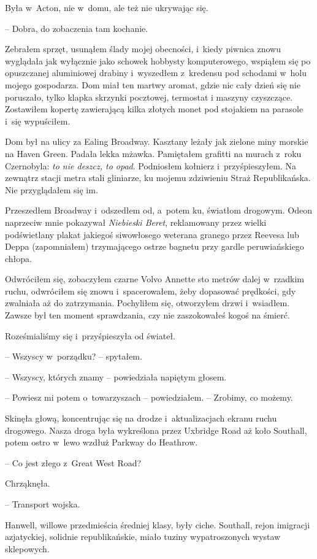 \documentclass[oneside,polish,11pt,sfheadings]{mwbk}
\begin{document}
Była w~Acton, nie w~domu, ale też nie ukrywając się.

-- Dobra, do zobaczenia tam kochanie.

Zebrałem sprzęt, usunąłem ślady mojej obecności, i~kiedy piwnica znowu
wyglądała jak wyłącznie jako schowek hobbysty komputerowego, wspiąłem
się po opuszczanej aluminiowej drabiny i~wyszedłem z~kredensu pod
schodami w~holu mojego gospodarza. Dom miał ten martwy aromat, gdzie nic
cały dzień się nie poruszało, tylko klapka skrzynki pocztowej, termostat
i maszyny czyszczące. Zostawiłem kopertę zawierającą kilka złotych monet
pod stojakiem na parasole i~się wypuściłem.

Dom był na ulicy za Ealing Broadway. Kasztany leżały jak zielone miny
morskie na Haven Green. Padała lekka mżawka. Pamiętałem grafitti na
murach z~roku Czernobyla: \emph{to nie deszcz, to opad}. Podniosłem
kołnierz i~przyśpieszyłem. Na zewnątrz stacji metra stali gliniarze, ku
mojemu zdziwieniu Straż Republikańska. Nie przyglądałem się im.

Przeszedłem Broadway i~odszedłem od, a~potem ku, światłom drogowym.
Odeon naprzeciw mnie pokazywał \emph{Niebieski Beret}, reklamowany przez
wielki podświetlany plakat jakiegoś siwowłosego weterana granego przez
Reevesa lub Deppa (zapomniałem) trzymającego ostrze bagnetu przy gardle
peruwiańskiego chłopa.

Odwróciłem się, zobaczyłem czarne Volvo Annette sto metrów dalej w~rzadkim ruchu, odwróciłem się znowu i~spacerowałem, żeby dopasować
prędkości, gdy zwalniała aż do zatrzymania. Pochyliłem się, otworzyłem
drzwi i~wsiadłem. Zawsze był ten moment sprawdzania, czy nie
zaszokowałeś kogoś na śmierć.

Roześmialiśmy się i~przyśpieszyła od świateł.

-- Wszyscy w~porządku? -- spytałem.

-- Wszyscy, których znamy -- powiedziała napiętym głosem.

-- Powiesz mi potem o~towarzyszach -- powiedziałem. -- Zrobimy, co możemy.

Skinęła głową, koncentrując się na drodze i~aktualizacjach ekranu ruchu
drogowego. Nasza droga była wykreślona przez Uxbridge Road aż koło
Southall, potem ostro w~lewo wzdłuż Parkway do Heathrow.

-- Co jest złego z~Great West Road?

Chrząknęła. 

-- Transport wojska.

Hanwell, willowe przedmieścia średniej klasy, były ciche. Southall,
rejon imigracji azjatyckiej, solidnie republikańskie, miało tuziny
wypatroszonych wystaw sklepowych.
\end{document}
